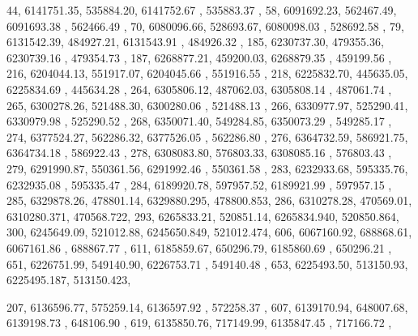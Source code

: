   44,  6141751.35,     535884.20,     6141752.67 ,   535883.37 ,
  58,  6091692.23,     562467.49,     6091693.38 ,   562466.49 ,
  70,  6080096.66,     528693.67,     6080098.03 ,   528692.58 ,
  79,  6131542.39,     484927.21,     6131543.91 ,   484926.32 ,
 185,  6230737.30,     479355.36,     6230739.16 ,   479354.73 ,
 187,  6268877.21,     459200.03,     6268879.35 ,   459199.56 ,
 216,  6204044.13,     551917.07,     6204045.66 ,   551916.55 ,
 218,  6225832.70,     445635.05,     6225834.69 ,   445634.28 ,
 264,  6305806.12,     487062.03,     6305808.14 ,   487061.74 ,
 265,  6300278.26,     521488.30,     6300280.06 ,   521488.13 ,
 266,  6330977.97,     525290.41,     6330979.98 ,   525290.52 ,
 268,  6350071.40,     549284.85,     6350073.29 ,   549285.17 ,
 274,  6377524.27,     562286.32,     6377526.05 ,   562286.80 ,
 276,  6364732.59,     586921.75,     6364734.18 ,   586922.43 ,
 278,  6308083.80,     576803.33,     6308085.16 ,   576803.43 ,
 279,  6291990.87,     550361.56,     6291992.46 ,   550361.58 ,
 283,  6232933.68,     595335.76,     6232935.08 ,   595335.47 ,
 284,  6189920.78,     597957.52,     6189921.99 ,   597957.15 ,
 285,  6329878.26,     478801.14,     6329880.295,   478800.853,
 286,  6310278.28,     470569.01,     6310280.371,   470568.722,
 293,  6265833.21,     520851.14,     6265834.940,   520850.864,
 300,  6245649.09,     521012.88,     6245650.849,   521012.474,
 606,  6067160.92,     688868.61,     6067161.86 ,   688867.77 ,
 611,  6185859.67,     650296.79,     6185860.69 ,   650296.21 ,
 651,  6226751.99,     549140.90,     6226753.71 ,   549140.48 ,
 653,  6225493.50,     513150.93,     6225495.187,   513150.423,

 207,  6136596.77,     575259.14,     6136597.92 ,   572258.37 ,
 607,  6139170.94,     648007.68,     6139198.73 ,   648106.90 ,
 619,  6135850.76,     717149.99,     6135847.45 ,   717166.72 ,
